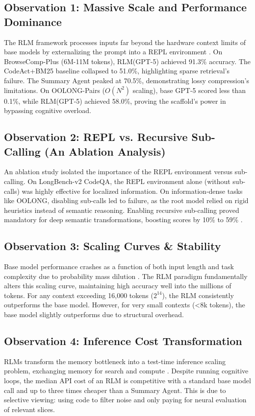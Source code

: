 \subsection{Observation 1: Massive Scale and Performance Dominance}
The RLM framework processes inputs far beyond the hardware context limits of base models by externalizing the prompt into a REPL environment \cite{zhang2025}. On BrowseComp-Plus (6M-11M tokens), RLM(GPT-5) achieved 91.3\% accuracy. The CodeAct+BM25 baseline collapsed to 51.0\%, highlighting sparse retrieval's failure. The Summary Agent peaked at 70.5\%, demonstrating lossy compression's limitations. On OOLONG-Pairs ($O(N^2)$ scaling), base GPT-5 scored less than 0.1\%, while RLM(GPT-5) achieved 58.0\%, proving the scaffold's power in bypassing cognitive overload.


\subsection{Observation 2: REPL vs. Recursive Sub-Calling (An Ablation Analysis)}
An ablation study isolated the importance of the REPL environment versus sub-calling. On LongBench-v2 CodeQA, the REPL environment alone (without sub-calls) was highly effective for localized information. On information-dense tasks like OOLONG, disabling sub-calls led to failure, as the root model relied on rigid heuristics instead of semantic reasoning. Enabling recursive sub-calling proved mandatory for deep semantic transformations, boosting scores by 10\% to 59\% \cite{bertsch2025}.

\subsection{Observation 3: Scaling Curves \& Stability}
Base model performance crashes as a function of both input length and task complexity due to probability mass dilution \cite{vaswani2017, liu2024}. The RLM paradigm fundamentally alters this scaling curve, maintaining high accuracy well into the millions of tokens. For any context exceeding 16,000 tokens ($2^{14}$), the RLM consistently outperforms the base model. However, for very small contexts (<8k tokens), the base model slightly outperforms due to structural overhead.



\subsection{Observation 4: Inference Cost Transformation}
RLMs transform the memory bottleneck into a test-time inference scaling problem, exchanging memory for search and compute \cite{zhang2025}. Despite running cognitive loops, the median API cost of an RLM is competitive with a standard base model call and up to three times cheaper than a Summary Agent. This is due to selective viewing: using code to filter noise and only paying for neural evaluation of relevant slices.



